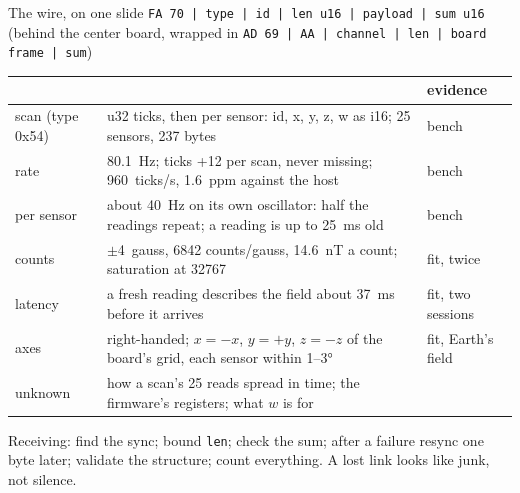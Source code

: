 \documentclass[aspectratio=169,11pt]{beamer}
\begin{document}
\begin{frame}{The wire, on one slide}
  \footnotesize
  \texttt{FA 70 | type | id | len u16 | payload | sum u16} \quad (behind the center board, wrapped in \texttt{AD 69 | AA | channel | len | board frame | sum})
  \vspace{2mm}
  \begin{tabular}{@{}lP{8.8cm}l@{}}
    \toprule
    & & evidence \\
    \midrule
    scan (type 0x54) & u32 ticks, then per sensor: id, x, y, z, w as i16; 25 sensors, 237 bytes & bench \\
    rate & \SI{80.1}{\hertz}; ticks +12 per scan, never missing; \SI{960}{ticks/s}, \SI{+1.6}{ppm} against the host & bench \\
    per sensor & about \SI{40}{\hertz} on its own oscillator: half the readings repeat; a reading is up to \SI{25}{\milli\second} old & bench \\
    counts & $\pm$\SI{4}{gauss}, 6842 counts/gauss, \SI{14.6}{\nano\tesla} a count; saturation at 32767 & fit, twice \\
    latency & a fresh reading describes the field about \SI{37}{\milli\second} before it arrives & fit, two sessions \\
    axes & right-handed; $x = -x$, $y = +y$, $z = -z$ of the board's grid, each sensor within 1–3° & fit, Earth's field \\
    unknown & how a scan's 25 reads spread in time; the firmware's registers; what $w$ is for & \\
    \bottomrule
  \end{tabular}
  \vspace{2mm}

  Receiving: find the sync; bound \texttt{len}; check the sum; after a failure resync one byte later; validate the structure; count everything. A lost link looks like junk, not silence.
\end{frame}
\end{document}
